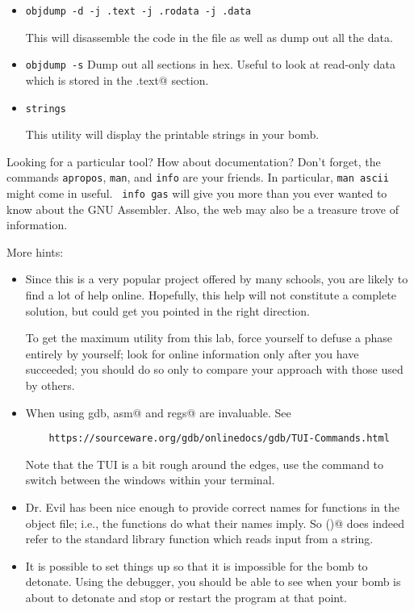 \documentclass[11pt]{article}
\begin{document}
\begin{itemize}
\item \texttt{objdump -d -j .text -j .rodata -j .data}

This will disassemble the code in the file as well as dump out all the
data.

\item \texttt{objdump -s}
  Dump out all sections in hex.  Useful to look at read-only data which is
  stored in the \verb@.text@ section.
  
\item {\tt strings }

This utility will display the printable strings in your bomb.



\end{itemize}

Looking for a particular tool?  How about documentation?  Don't
forget, the commands {\tt apropos}, {\tt man}, and {\tt info} are your
friends.  In particular, {\tt man ascii} might come in useful. {\tt
  info gas} will give you more than you ever wanted to know about the
GNU Assembler. Also, the web may also be a treasure trove of
information.

More hints:

\begin{itemize}
\item Since this is a very popular project offered by many schools, you
  are likely to find a lot of help online.  Hopefully, this help will
  not constitute a complete solution, but could get you pointed in the
  right direction.

  To get the maximum utility from this lab, force yourself to defuse a
  phase entirely by yourself; look for online information only after
  you have succeeded; you should do so only to compare your approach
  with those used by others.

\item When using gdb, \verb@layout asm@ and \verb@layout regs@ are
  invaluable.  See

  \begin{verbatim}
    https://sourceware.org/gdb/onlinedocs/gdb/TUI-Commands.html
  \end{verbatim}

  Note that the TUI is a bit rough around the edges, use the
  \verb@focus@ command to switch between the windows within your
  terminal.

\item Dr. Evil has been nice enough to provide correct names for functions
  in the object file; i.e., the functions do what their names imply.  So
  \verb@sscanf()@ does indeed refer to the standard library function
  which reads input from a string.

\item It is possible to set things up so that it is impossible for the
  bomb to detonate.  Using the debugger, you should be able to see
  when your bomb is about to detonate and stop or restart the program
  at that point.
\end{itemize}
\end{document}
